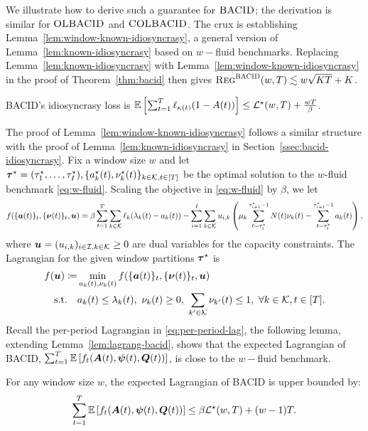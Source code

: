 We illustrate how to derive such a guarantee for $\textsc{BACID}$; the derivation is similar for $\textsc{OLBACID}$ and $\textsc{COLBACID}$. The crux is establishing Lemma~\ref{lem:window-known-idiosyncrasy}, a general version of Lemma~\ref{lem:known-idiosyncrasy} based on $w-$fluid benchmarks. Replacing Lemma~\ref{lem:known-idiosyncrasy} with Lemma~\ref{lem:window-known-idiosyncrasy} in the proof of Theorem~\ref{thm:bacid} then gives $\textsc{Reg}^{\textsc{BACID}}(w,T) \lesssim w\sqrt{KT} + K$.
 \begin{lemma}\label{lem:window-known-idiosyncrasy}
\textsc{BACID}'s idiosyncrasy loss is
$\mathbb E\left[\sum_{t=1}^T \ell_{\kappa(t)}(1 - A(t))\right] \leq \mathcal{L}^\star(w,T)+\frac{wT}{\beta}$.
\end{lemma}
The proof of  Lemma~\ref{lem:window-known-idiosyncrasy} follows a similar structure with the proof of Lemma~\ref{lem:known-idiosyncrasy} in Section~\ref{ssec:bacid-idiosyncrasy}. Fix a window size $w$ and let $\boldsymbol{\tau}^\star = (\tau^\star_1,\ldots,\tau^\star_I), \{a^\star_k(t), \nu^\star_k(t)\}_{k \in \mathcal{K},t \in [T]}$ be the optimal solution to the $w$-fluid benchmark \eqref{eq:w-fluid}. Scaling the objective in \eqref{eq:w-fluid} by $\beta$, we let 
\[f(\{\boldsymbol{a}(t)\}_t,\{\boldsymbol{\nu}(t)\}_t,\boldsymbol{u}) = \beta\sum_{t=1}^T \sum_{k \in \mathcal{K}} \ell_k(\lambda_k(t) - a_k(t))-\sum_{i=1}^I\sum_{k\in\mathcal{K}}u_{i,k}\left(\mu_k\sum_{t=\tau^\star_i}^{\tau^\star_{i+1}-1} N(t)\nu_k(t) - \sum_{t=\tau^\star_i}^{\tau^\star_{i+1}-1} a_k(t)\right),\]
where $\boldsymbol{u} = (u_{i,k})_{i \in \mathcal{I}, k \in \mathcal{K}} \geq 0$ are dual variables for the capacity constraints. The Lagrangian for the given window partitions $\boldsymbol{\tau}^\star$ is 
\begin{equation}
\begin{aligned}
f(\boldsymbol{u})\coloneqq&\min_{a_k(t),\nu_k(t)} f(\{\boldsymbol{a}(t)\}_t,\{\boldsymbol{\nu}(t)\}_t,\boldsymbol{u})  \\
\text{s.t.}\quad& a_k(t) \leq \lambda_k(t),~\nu_k(t) \geq 0,~\sum_{k' \in \mathcal{K}} \nu_{k'}(t) \leq 1,~\forall k \in \mathcal{K}, t\in [T].
\end{aligned}
\end{equation}
Recall the per-period Lagrangian in \eqref{eq:per-period-lag}, the following lemma, extending Lemma~\ref{lem:lagrang-bacid}, shows that the expected Lagrangian of \textsc{BACID}, $\sum_{t=1}^T \mathbb E\left[f_t(\boldsymbol{A}(t), \boldsymbol{\psi}(t), \boldsymbol{Q}(t))\right]$, is close to the $w-$fluid benchmark. 
\begin{lemma}\label{lem:window-lagrang-bacid}
For any window size $w$, the expected Lagrangian of \textsc{BACID} is upper bounded by:
\[
\sum_{t=1}^T \mathbb E\left[f_t(\boldsymbol{A}(t), \boldsymbol{\psi}(t), \boldsymbol{Q}(t))\right]  \leq \beta \mathcal{L}^\star(w,T) + (w-1)T.
\]
\end{lemma}
